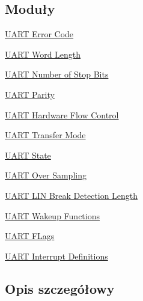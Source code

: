\subsection*{Moduły}
\begin{DoxyCompactItemize}
\item 
\hyperlink{group___u_a_r_t___error___code}{U\+A\+R\+T Error Code}
\item 
\hyperlink{group___u_a_r_t___word___length}{U\+A\+R\+T Word Length}
\item 
\hyperlink{group___u_a_r_t___stop___bits}{U\+A\+R\+T Number of Stop Bits}
\item 
\hyperlink{group___u_a_r_t___parity}{U\+A\+R\+T Parity}
\item 
\hyperlink{group___u_a_r_t___hardware___flow___control}{U\+A\+R\+T Hardware Flow Control}
\item 
\hyperlink{group___u_a_r_t___mode}{U\+A\+R\+T Transfer Mode}
\item 
\hyperlink{group___u_a_r_t___state}{U\+A\+R\+T State}
\item 
\hyperlink{group___u_a_r_t___over___sampling}{U\+A\+R\+T Over Sampling}
\item 
\hyperlink{group___u_a_r_t___l_i_n___break___detection___length}{U\+A\+R\+T L\+I\+N Break Detection Length}
\item 
\hyperlink{group___u_a_r_t___wake_up__functions}{U\+A\+R\+T Wakeup Functions}
\item 
\hyperlink{group___u_a_r_t___flags}{U\+A\+R\+T F\+Lags}
\item 
\hyperlink{group___u_a_r_t___interrupt__definition}{U\+A\+R\+T Interrupt Definitions}
\end{DoxyCompactItemize}


\subsection{Opis szczegółowy}
